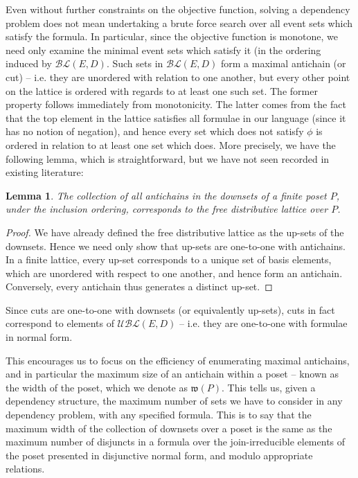 \documentclass[hoptionsi,review,format=acmsmall]{acmart}
\newtheorem{lemma}[theorem]{Lemma}
\theoremstyle{definition}
\newcommand{\UBLc}{\mathcal{UBL}}
\newcommand{\BLc}{\mathcal{BL}}
\newcommand{\Wf}{\mathfrak{w}}
\begin{document}
Even without further constraints on the objective function, solving a dependency problem does not mean undertaking a brute force search over all event sets which satisfy the formula. In particular, since the objective function is monotone, we need only examine the minimal event sets which satisfy it (in the ordering induced by \(\BLc(E,D)\). Such sets in \(\BLc(E,D)\) form a maximal  antichain (or cut) -- i.e. they are unordered with relation to one another, but every other point on the lattice is ordered with regards to at least one such set. The former property follows immediately from monotonicity. The latter comes from the fact that the top element in the lattice satisfies all formulae in our language (since it has no notion of negation), and hence every set which does not satisfy \(\phi\) is ordered in relation to at least one set which does.  More precisely, we have the following lemma, which is straightforward, but we have not seen recorded in existing literature:

\begin{lemma}
The collection of all antichains in the downsets of a finite poset \(P\), under the inclusion ordering, corresponds to the free distributive lattice over \(P\).
\end{lemma}
\begin{proof}
We have already defined the free distributive lattice as the up-sets of the downsets. Hence we need only show that up-sets are one-to-one with antichains. In a finite lattice, every up-set corresponds to a unique set of basis elements, which are unordered with respect to one another, and hence form an antichain. Conversely, every antichain thus generates a distinct up-set.
\end{proof}

Since cuts are one-to-one with downsets (or equivalently up-sets), cuts in fact correspond to elements of \(\UBLc(E,D)\) -- i.e. they are one-to-one with formulae in normal form.  

This encourages us to focus on the efficiency of enumerating maximal antichains, and in particular the maximum size of an antichain within a poset -- known as the width of the poset, which we denote as \(\Wf(P)\). This tells us, given a dependency structure, the maximum number of sets we have to consider in any dependency problem, with any specified formula. This is to say that the maximum width of the collection of downsets over a poset is the same as the maximum number of disjuncts in a formula over the join-irreducible elements of the poset presented in disjunctive normal form, and modulo appropriate relations.  
\end{document}

